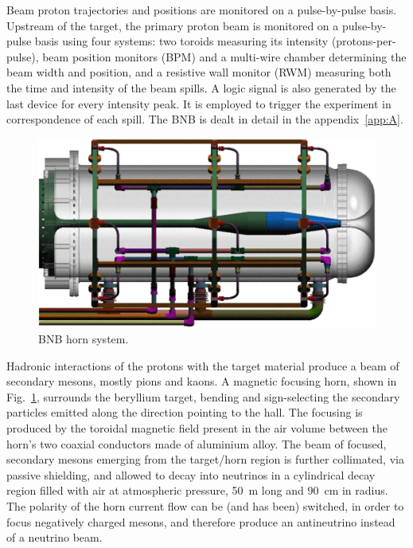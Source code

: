  Beam proton trajectories and positions are monitored on a pulse-by-pulse basis.
 Upstream of the target, the primary proton beam is monitored on a pulse-by-pulse basis %
 using four systems: %
 two toroids measuring its intensity (protons-per-pulse), beam position monitors %
 (BPM) and a multi-wire chamber determining the beam width and position, %
 and a resistive wall monitor (RWM) measuring both the time and intensity of the beam spills.
 A logic signal is also generated by the last device for every intensity peak.
 It is employed to trigger the experiment in correspondence of each spill.
 The BNB is dealt in detail in the appendix~\ref{app:A}.

 \begin{figure}[]
  \centering
  \includegraphics[scale=.2]{pics/bnbhorn}
  \caption{BNB horn system.}
  \label{fig:bnbhorn}
 \end{figure}

 Hadronic interactions of the protons with the target material produce a beam of %
 secondary mesons, mostly pions and kaons. 
 A magnetic focusing horn, shown in Fig.~\ref{fig:bnbhorn}, surrounds the beryllium target, %
 bending and sign-selecting the secondary particles emitted along the direction pointing to the hall.
 The focusing is produced by the toroidal magnetic field present in the air volume %
 between the horn’s two coaxial conductors made of aluminium alloy. 
 The beam of focused, secondary mesons emerging from the target/horn region is further collimated, %
 via passive shielding, and allowed to decay into neutrinos in a cylindrical decay %
 region filled with air at atmospheric pressure, 50~m long and 90~cm in radius. 
 The polarity of the horn current flow can be (and has been) switched, in order to %
 focus negatively charged mesons, and therefore produce an antineutrino instead of a neutrino beam.

